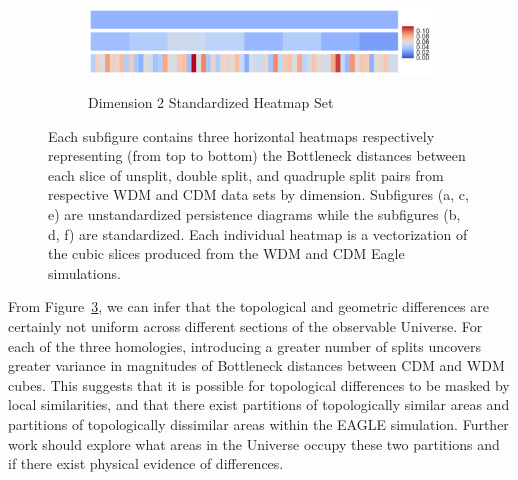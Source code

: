 \documentclass[12pt]{article}
\newcommand{\figref}[1]{Figure~\ref{#1}}
\begin{document}
\begin{figure}[htp!]
\begin{subfigure}{.45\textwidth}
    \label{fig:cubeHeatmap2}
  \end{subfigure}
  \begin{subfigure}{.45\textwidth}
    \centering
    \caption{Dimension 2 Standardized Heatmap Set}
    \includegraphics[width=\linewidth]{hmap_dim2_yesnorm.pdf}
    \label{fig:cubeHeatmapStand2}
  \end{subfigure}
  \caption{Each subfigure contains three horizontal heatmaps respectively representing (from top to bottom) the Bottleneck distances between each slice of unsplit, double split, and quadruple split pairs from respective WDM and CDM data sets by dimension. Subfigures (a, c, e) are unstandardized persistence diagrams while the subfigures (b, d, f) are standardized. Each individual heatmap is a vectorization of the cubic slices produced from the WDM and CDM Eagle simulations.}
  \label{fig:cubeHeatmap}
\end{figure}

From \figref{fig:cubeHeatmap}, we can infer that the topological and geometric differences are certainly not uniform across different sections of the observable Universe. For each of the three homologies, introducing a greater number of splits uncovers greater variance in magnitudes of Bottleneck distances between CDM and WDM cubes. This suggests that it is possible for topological differences to be masked by local similarities, and that there exist partitions of topologically similar areas and partitions of topologically dissimilar areas within the EAGLE simulation. Further work should explore what areas in the Universe occupy these two partitions and if there exist physical evidence of differences. 
\end{document}

